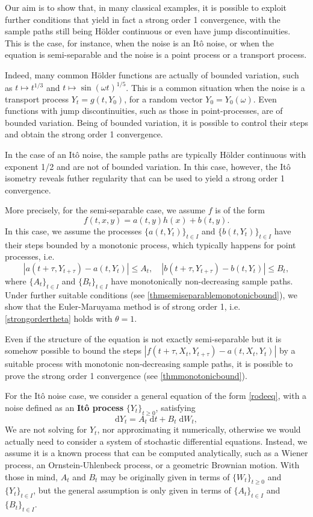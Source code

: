 \documentclass[reqno,12pt]{amsart}
\theoremstyle{plain}%
\theoremstyle{definition}
\begin{document}
Our aim is to show that, in many classical examples, it is possible to exploit further conditions that yield in fact a strong order 1 convergence, with the sample paths still being H\"older continuous or even have jump discontinuities. This is the case, for instance, when the noise is an It\^o noise, or when the equation is semi-separable and the noise is a point process or a transport process.

Indeed, many common H\"older functions are actually of bounded variation, such as $t\mapsto t^{1/3}$ and $t\mapsto \sin(\omega t)^{1/5}$. This is a common situation when the noise is a transport process $Y_t = g(t, Y_0)$, for a random vector $Y_0 = Y_0(\omega)$. Even functions with jump discontinuities, such as those in point-processes, are of bounded variation. Being of bounded variation, it is possible to control their steps and obtain the strong order 1 convergence.

In the case of an It\^o noise, the sample paths are typically H\"older continuous with exponent 1/2 and are not of bounded variation. In this case, however, the It\^o isometry reveals futher regularity that can be used to yield a strong order 1 convergence.

More precisely, for the semi-separable case, we assume $f$ is of the form 
\[
    f(t, x, y) = a(t, y)h(x) + b(t, y).  
\]
In this case, we assume the processes $\{a(t, Y_t)\}_{t\in I}$ and $\{b(t, Y_t)\}_{t\in I}$ have their steps bounded by a monotonic process, which typically happens for point processes, i.e.
\[
|a(t+\tau, Y_{t+\tau}) - a(t, Y_t)| \leq A_t, \quad |b(t+\tau, Y_{t+\tau}) - b(t, Y_t)| \leq B_t,
\]
where $\{A_t\}_{t\in I}$ and $\{B_t\}_{t\in I}$ have monotonically non-decreasing sample paths. Under further suitable conditions (see \cref{thmsemiseparablemonotonicbound}), we show that the Euler-Maruyama method is of strong order 1, i.e. \eqref{strongordertheta} holds with $\theta=1$.

Even if the structure of the equation is not exactly semi-separable but it is somehow possible to bound the steps $|f(t+\tau, X_t, Y_{t+\tau}) - a(t, X_t, Y_t)|$ by a suitable process with monotonic non-decreasing sample paths, it is possible to prove the strong order 1 convergence (see \cref{thmmonotonicbound}).

For the It\^o noise case, we consider a general equation of the form \eqref{rodeeq}, with a noise defined as an \textbf{It\^o process} $\{Y_t\}_{t\geq 0}$, satisfying
\begin{equation}
  \mathrm{d}Y_t = A_t \;\mathrm{d}t + B_t \;\mathrm{d}W_t,
\end{equation}
We are not solving for $Y_t$, nor approximating it numerically, otherwise we would actually need to consider a system of stochastic differential equations. Instead, we assume it is a known process that can be computed analytically, such as a Wiener process, an Ornstein-Uhlenbeck process, or a geometric Brownian motion. With those in mind, $A_t$ and $B_t$ may be originally given in terms of $\{W_t\}_{t\geq 0}$ and $\{Y_t\}_{t\in I}$, but the general assumption is only given in terms of $\{A_t\}_{t\in I}$ and $\{B_t\}_{t\in I}$.
\end{document}
